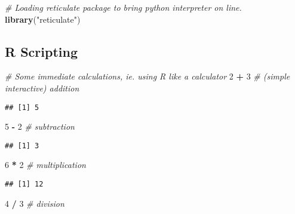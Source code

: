 \documentclass[]{book}
\newenvironment{Shaded}{\begin{snugshade}}{\end{snugshade}}
\newcommand{\KeywordTok}[1]{\textcolor[rgb]{0.13,0.29,0.53}{\textbf{#1}}}
\newcommand{\DecValTok}[1]{\textcolor[rgb]{0.00,0.00,0.81}{#1}}
\newcommand{\StringTok}[1]{\textcolor[rgb]{0.31,0.60,0.02}{#1}}
\newcommand{\CommentTok}[1]{\textcolor[rgb]{0.56,0.35,0.01}{\textit{#1}}}
\newcommand{\OperatorTok}[1]{\textcolor[rgb]{0.81,0.36,0.00}{\textbf{#1}}}
\newcommand{\NormalTok}[1]{#1}
\theoremstyle{definition}
\theoremstyle{definition}
\theoremstyle{definition}
\theoremstyle{remark}
\begin{document}
\begin{Shaded}
\begin{Highlighting}[]
\CommentTok{# Loading reticulate package to bring python interpreter on line.}
\KeywordTok{library}\NormalTok{(}\StringTok{"reticulate"}\NormalTok{)}
\end{Highlighting}
\end{Shaded}

\subsection{R Scripting}\label{r-scripting}

\begin{Shaded}
\begin{Highlighting}[]
\CommentTok{# Some immediate calculations, ie. using R like a calculator}
\DecValTok{2} \OperatorTok{+}\StringTok{ }\DecValTok{3}           \CommentTok{# (simple interactive) addition}
\end{Highlighting}
\end{Shaded}

\begin{verbatim}
## [1] 5
\end{verbatim}

\begin{Shaded}
\begin{Highlighting}[]
\DecValTok{5} \OperatorTok{-}\StringTok{ }\DecValTok{2}           \CommentTok{# subtraction}
\end{Highlighting}
\end{Shaded}

\begin{verbatim}
## [1] 3
\end{verbatim}

\begin{Shaded}
\begin{Highlighting}[]
\DecValTok{6} \OperatorTok{*}\StringTok{ }\DecValTok{2}           \CommentTok{# multiplication}
\end{Highlighting}
\end{Shaded}

\begin{verbatim}
## [1] 12
\end{verbatim}

\begin{Shaded}
\begin{Highlighting}[]
\DecValTok{4} \OperatorTok{/}\StringTok{ }\DecValTok{3}           \CommentTok{# division}
\end{Highlighting}
\end{Shaded}
\end{document}
